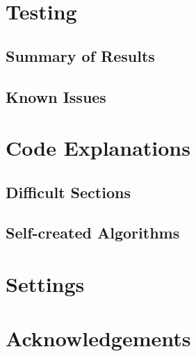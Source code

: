 \section{Testing}

\subsection{Summary of Results}

\subsection{Known Issues}

\section{Code Explanations}

\subsection{Difficult Sections}

\subsection{Self-created Algorithms}

\section{Settings}

\section{Acknowledgements}

